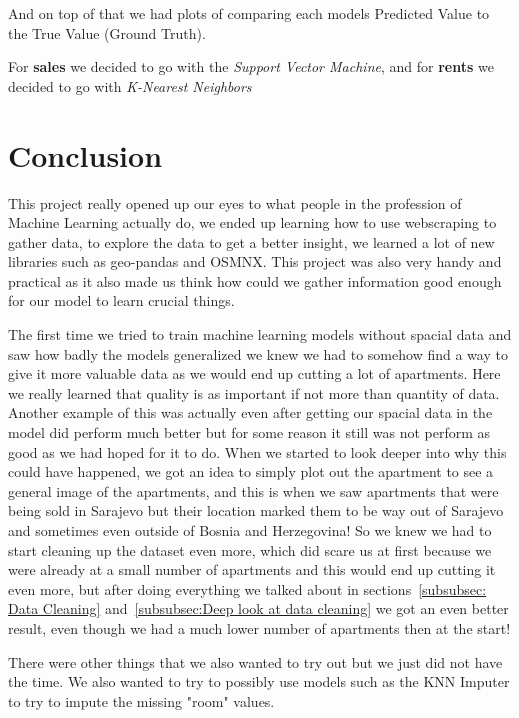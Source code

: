\documentclass[11pt]{article}
\begin{document}
		\noindent And on top of that we had plots of comparing each models Predicted Value to the True Value (Ground Truth). \newline

		\noindent For \textbf{sales} we decided to go with the \emph{Support Vector Machine}, and for \textbf{rents} we decided to go with \emph{K-Nearest Neighbors}

	\section{Conclusion}
		\noindent This project really opened up our eyes to what people in the profession of Machine Learning actually do, we ended up learning how to use webscraping to
		gather data, to explore the data to get a better insight, we learned a lot of new libraries such as geo-pandas and OSMNX. This project was also very handy
		and practical as it also made us think how could we gather information good enough for our model to learn crucial things. \newline

		\noindent The first time we tried to train machine learning models without spacial data and saw how badly the models generalized we knew we had to somehow
		find a way to give it more valuable data as we would end up cutting a lot of apartments.
		Here we really learned that quality is as important if not more than quantity of data. Another example of this was actually even after getting our spacial data in the model did perform
		much better but for some reason it still was not perform as good as we had hoped for it to do.
		When we started to look deeper into why this could have happened, we got an idea to simply plot out the apartment to see a general image of the apartments, and this is when we saw
		apartments that were being sold in Sarajevo but their location marked them to be way out of Sarajevo and sometimes even outside of Bosnia and Herzegovina!
		So we knew we had to start cleaning up the dataset even more, which did scare us at first because we were already at a small number of apartments and this would end up cutting it even more,
		but after doing everything we talked about in sections~\ref{subsubsec: Data Cleaning} and~\ref{subsubsec:Deep look at data cleaning} we got an even better result, even though we had a much lower
		number of apartments then at the start! \newline

		\pagebreak
		\noindent There were other things that we also wanted to try out but we just did not have the time. We also wanted to try to possibly use models such as the KNN Imputer to try to
		impute the missing "room" values. \newline
\end{document}
